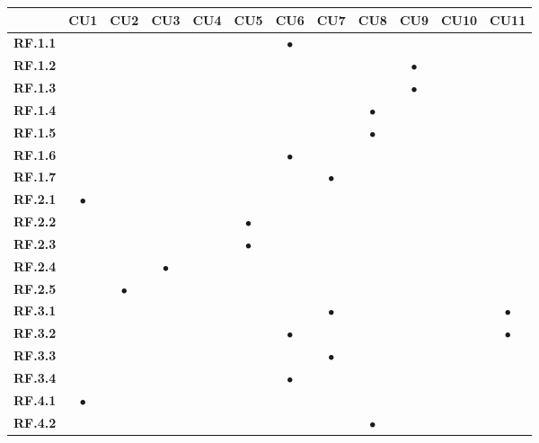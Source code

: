 \begin{table}[H]
    \centering
    \small
    \begin{tabular}{|c|@{}c|@{}c|@{}c|@{}c|@{}c|@{}c|@{}c|@{}c|@{}c|@{}c|@{}c|}
    \hline
               & \textbf{CU1} & \textbf{CU2} & \textbf{CU3} & \textbf{CU4} & \textbf{CU5} & \textbf{CU6} & \textbf{CU7} & \textbf{CU8} & \textbf{CU9} & \textbf{CU10} & \textbf{CU11}\\
    \hline
    \hline
        \textbf{RF.1.1} &  &  & & &  & $\bullet$&  &  &  & & \\
        \hline
        \textbf{RF.1.2} &  &  & & &  &  &  &  & $\bullet$ & & \\
        \hline
        \textbf{RF.1.3} &  &  & &  &  &  &  &  & $\bullet$ & & \\
        \hline
        \textbf{RF.1.4} &  &  & &  &  &  &  & $\bullet$ &  & & \\
        \hline
        \textbf{RF.1.5} &  &  & &  &  &  &  & $\bullet$ &  & & \\
        \hline
        \textbf{RF.1.6} &  &  & &  &  & $\bullet$ &  &  &  & & \\
        \hline
        \textbf{RF.1.7} &  &  & &  &  &  &  $\bullet$ &  &  & & \\
        \hline
        \textbf{RF.2.1} & $\bullet$ &  &  & &  &  &  &  &  & & \\
        \hline
        \textbf{RF.2.2} &  &  &  & & $\bullet$ &  &  &  &  & & \\
        \hline
        \textbf{RF.2.3} &  &  & & & $\bullet$ &  &  &  &  & & \\
        \hline
        \textbf{RF.2.4} &  &  & $\bullet$ & & &  &  &  &  & & \\
        \hline
        \textbf{RF.2.5} &  & $\bullet$ &  & & &  &  &  &  & & \\
        \hline
        \textbf{RF.3.1} &  &  &  & &  &  & $\bullet$ &  &  & & $\bullet$ \\
        \hline
        \textbf{RF.3.2} &  &  &  & & & $\bullet$ &  &  &  & & $\bullet$ \\
        \hline
        \textbf{RF.3.3} &  &  &  & & &  & $\bullet$ &  &  & & \\
        \hline
        \textbf{RF.3.4} &  &  &  & & & $\bullet$ &  &  &  & & \\
        \hline
        \textbf{RF.4.1} & $\bullet$ & & &  &  &  &  &  &  & & \\
        \hline
        \textbf{RF.4.2} &  &  & & &  &  &  & $\bullet$ &  & & \\

\end{tabular}
\end{table}
